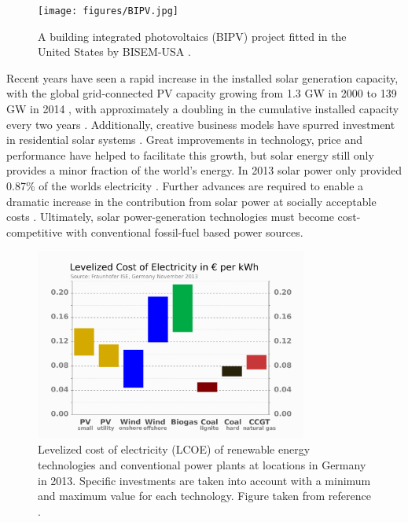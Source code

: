 \begin{figure}[h!]
  \centering
    \texttt{[image: figures/BIPV.jpg]}
    \caption{A building integrated photovoltaics (BIPV) project fitted in the United States by BISEM-USA \cite{BIPV}.}
  \label{BIPV}
\end{figure}

Recent years have seen a rapid increase in the installed solar generation capacity, with the global grid-connected PV capacity growing from 1.3 GW in 2000 to 139 GW in 2014 \cite{pathways_129}, with approximately a doubling in the cumulative installed capacity every two years \cite{pathways}. Additionally, creative business models have spurred investment in residential solar systems \cite{MIT}. Great improvements in technology, price and performance have helped to facilitate this growth, but solar energy still only provides a minor fraction of the world's energy. In 2013 solar power only provided 0.87\% of the worlds electricity \cite{pathways_130}. Further advances are required to enable a dramatic increase in the contribution from solar power at socially acceptable costs \cite{MIT}. Ultimately, solar power-generation technologies must become cost-competitive with conventional fossil-fuel based power sources.\\

\begin{figure}[h!]
  \centering
    \includegraphics[width=0.8\textwidth]{figures/LCOE.png}
    \caption{Levelized cost of electricity (LCOE) of renewable energy technologies and conventional power plants at locations in Germany in 2013.  Specific investments are taken into account with a minimum and maximum value for each technology. Figure taken from reference .}
  \label{LCOE}
\end{figure}

